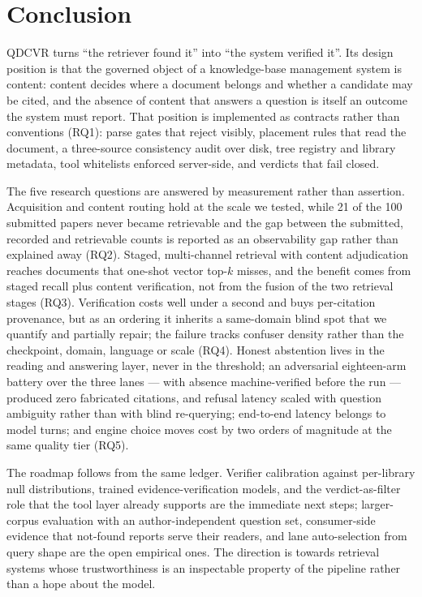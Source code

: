 \section{Conclusion}
\label{sec:conclusion}

QDCVR turns ``the retriever found it'' into ``the system verified it''. Its
design position is that the governed object of a knowledge-base management
system is content: content decides where a document belongs and whether a
candidate may be cited, and the absence of content that answers a question is
itself an outcome the system must report. That position is implemented as
contracts rather than conventions (RQ1): parse gates that reject visibly,
placement rules that read the document, a three-source consistency audit over
disk, tree registry and library metadata, tool whitelists enforced server-side,
and verdicts that fail closed.

The five research questions are answered by measurement rather than
assertion. Acquisition and content routing hold at the scale we tested, while
21 of the 100 submitted papers never became retrievable and the gap between the
submitted, recorded and retrievable counts is reported as an observability gap
rather than explained away (RQ2). Staged, multi-channel retrieval with content
adjudication reaches documents that one-shot vector top-$k$ misses, and the
benefit comes from staged recall plus content verification, not from the fusion
of the two retrieval stages (RQ3). Verification costs well under a second and
buys per-citation provenance, but as an ordering it inherits a same-domain
blind spot that we quantify and partially repair; the failure tracks confuser
density rather than the checkpoint, domain, language or scale (RQ4). Honest
abstention lives in the reading and answering layer, never in the threshold;
an adversarial eighteen-arm battery over the three lanes --- with absence
machine-verified before the run --- produced zero fabricated citations, and
refusal latency scaled with question ambiguity rather than with blind
re-querying;
end-to-end latency belongs to model turns; and engine choice moves cost by two
orders of magnitude at the same quality tier (RQ5).

The roadmap follows from the same ledger. Verifier calibration against
per-library null distributions, trained evidence-verification models, and the
verdict-as-filter role that the tool layer already supports are the immediate
next steps; larger-corpus evaluation with an author-independent question set,
consumer-side evidence that not-found reports serve their readers, and lane
auto-selection from query shape are the open empirical ones. The direction is
towards retrieval systems whose trustworthiness is an inspectable property of
the pipeline rather than a hope about the model.
